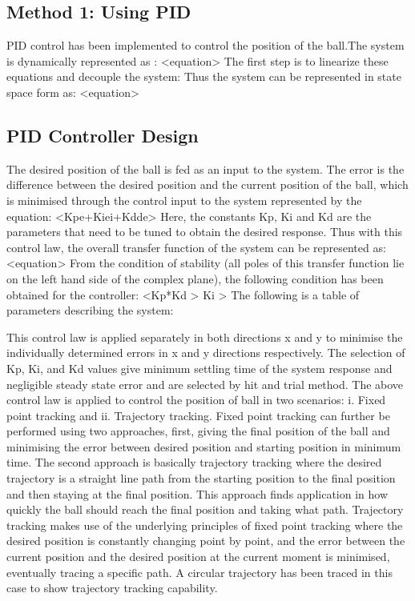 \documentclass[conference]{IEEEtran}
\begin{document}
\subsection{Method 1: Using PID}
PID control has been implemented to control the position of the ball.The system is dynamically represented as : <equation> The first step is to linearize these equations and decouple the system: 
Thus the system can be represented in state space form as: <equation>

\subsection*{PID Controller Design}
The desired position of the ball is fed as an input to the system. The error is the difference between the desired position and the current position of the ball, which is minimised through the control input to the system represented by the equation: <Kpe+Kiei+Kdde> Here, the constants Kp, Ki and Kd are the parameters that need to be tuned to obtain the desired response. Thus with this control law, the overall transfer function of the system can be represented as: <equation>
From the condition of stability (all poles of this transfer function lie on the left hand side of the complex plane), the following condition has been obtained for the controller: <Kp*Kd > Ki >
The following is a table of parameters describing the system:

This control law is applied separately in both directions x and y to minimise the individually determined errors in x and y directions respectively. The selection of Kp, Ki, and Kd values give minimum settling time of the system response and negligible steady state error and are selected by hit and trial method.
The above control law is applied to control the position of ball in two scenarios: i. Fixed point tracking and ii. Trajectory tracking.
Fixed point tracking can further be performed using two approaches, first, giving the final position of the ball and minimising the error between desired position and starting position in minimum time. The second approach is basically trajectory tracking where the desired trajectory is a straight line path from the starting position to the final position and then staying at the final position. This approach finds application in how quickly the ball should reach the final position and taking what path.
Trajectory tracking makes use of the underlying principles of fixed point tracking where the desired position is constantly changing point by point, and the error between the current position and the desired position at the current moment is minimised, eventually tracing a specific path. A circular trajectory has been traced in this case to show trajectory tracking capability.
\end{document}
